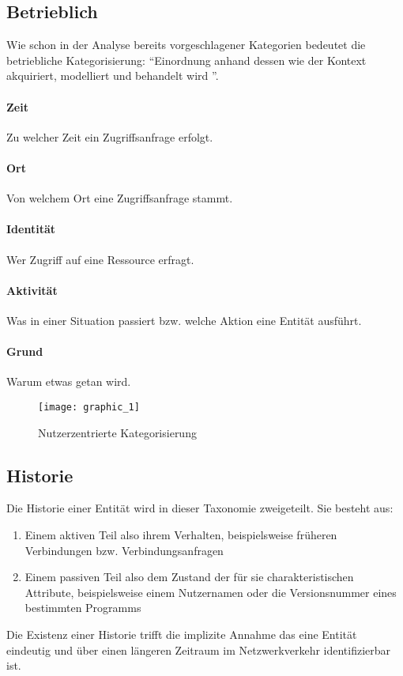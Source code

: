 \subsection{Betrieblich}
Wie schon in der Analyse bereits vorgeschlagener Kategorien bedeutet die betriebliche Kategorisierung: ``Einordnung anhand dessen wie der Kontext akquiriert, modelliert und behandelt wird ''.
\paragraph{Zeit}
Zu welcher Zeit ein Zugriffsanfrage erfolgt.
\paragraph{Ort}
Von welchem Ort eine Zugriffsanfrage stammt.
\paragraph{Identität}
Wer Zugriff auf eine Ressource erfragt.
\paragraph{Aktivität}
Was in einer Situation passiert bzw. welche Aktion eine Entität ausführt.
\paragraph{Grund}
Warum etwas getan wird.
\begin{figure}[H]
\centering
\texttt{[image: graphic\_1]}
\caption{Nutzerzentrierte Kategorisierung}
\end{figure}
\subsection{Historie}
Die Historie einer Entität wird in dieser Taxonomie zweigeteilt. Sie besteht aus:
\begin{enumerate}
\item{Einem aktiven Teil also ihrem Verhalten, beispielsweise früheren Verbindungen bzw. Verbindungsanfragen}
\item{Einem passiven Teil also dem Zustand der für sie charakteristischen Attribute, beispielsweise einem Nutzernamen oder die Versionsnummer eines bestimmten Programms}
\end{enumerate}
Die Existenz einer Historie trifft die implizite Annahme das eine Entität eindeutig und über einen längeren Zeitraum im Netzwerkverkehr identifizierbar ist.
